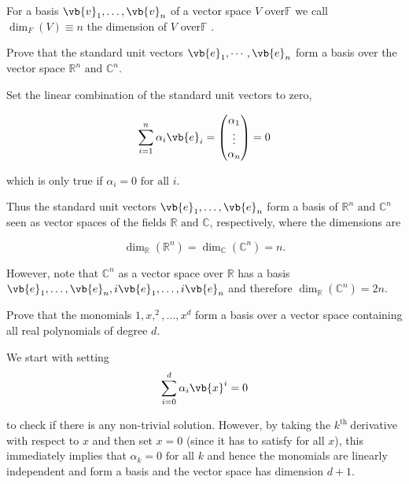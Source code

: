 \documentclass[a4paper,12pt]{report}
\begin{document}
\begin{definition} \label{dimension} 
For a basis \(\vb{v}_{1}, \ldots, \vb{v}_n \) of a vector space \(V\) over\(\mathbb{F}\) we call \(\dim _{F} (V) \equiv n \) the dimension of \(V\) over\(\mathbb{F}\) . 
\end{definition}

{Prove that the standard unit vectors \(\vb{e}_1, \cdots, \vb{e}_n \) form a basis over the vector space \(\mathbb{R}^{n} \text { and } \mathbb{C}^{n} \). }
{Set the linear combination of the standard unit vectors to zero, 

\begin{equation}
    \sum_{i=1}^{n} \alpha _{i} \vb{e} _{i} = \begin{pmatrix}
         \alpha _{1}  \\
         \vdots  \\
         \alpha _{n}  \\
    \end{pmatrix} =0
\end{equation}

which is only true if \(\alpha _{i} = 0 \text{ for all } i\).

Thus the standard unit vectors \(\vb{e}_{1}, \ldots, \vb{e}_n \) form a basis of \(\mathbb{R}^{n} \text { and } \mathbb{C}^{n}  \) seen as vector spaces of the fields \(\mathbb{R}\text { and } \mathbb{C}\), respectively, where the dimensions are 

\begin{equation}
    \dim _{\mathbb{R}} (\mathbb{R}^{n} ) = \dim _{\mathbb{C}} (\mathbb{C}^{n} ) = n. 
\end{equation}

However, note that \(\mathbb{C}^{n} \) as a vector space over \(\mathbb{R}\) has a basis \(\vb{e}_{1}, \ldots, \vb{e}_n, i \vb{e} _{1}, \ldots , i \vb{e} _{n}   \) and therefore \(\dim _{\mathbb{R}} (\mathbb{C}^{n} ) = 2n\). 
} 

{Prove that the monomials \(1,x,^2,\ldots ,x^{d} \) form a basis over a vector space containing all real polynomials of degree \(d\).}
{We start with setting  
\begin{equation}
    \sum_{i=0}^{d} \alpha _{i} \vb{x} ^{i} =0 
\end{equation}

to check if there is any non-trivial solution. However, by taking the \(k^{\text{th }} \)derivative with respect to \(x\) and then set \(x=0\) (since it has to satisfy for all \(x\)), this immediately implies that \(\alpha _{k} = 0 \text{ for all }  k\) and hence the monomials are linearly independent and form a basis and the vector space has dimension \(d+1\).
}
\end{document}
